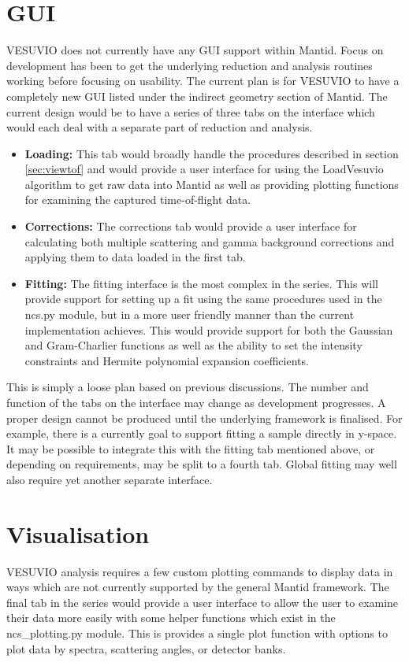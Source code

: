 \documentclass[paper=a4, fontsize=11pt]{scrartcl}	%
\numberwithin{equation}{section}															%
\numberwithin{figure}{section}																%
\numberwithin{table}{section}
\begin{document}
\section{GUI}
\label{sec:GUI}
VESUVIO does not currently have any GUI support within Mantid. Focus on development has been to get the underlying reduction and analysis routines working before focusing on usability. The current plan is for VESUVIO to have a completely new GUI listed under the indirect geometry section of Mantid. The current design would be to have a series of three tabs on the interface which would each deal with a separate part of reduction and analysis.

\begin{itemize}
\item \textbf{Loading:} This tab would broadly handle the procedures described in section \ref{sec:viewtof} and would provide a user interface for using the LoadVesuvio algorithm to get raw data into Mantid as well as providing plotting functions for examining the captured time-of-flight data.

\item \textbf{Corrections:} The corrections tab would provide a user interface for calculating both multiple scattering and gamma background corrections and applying them to data loaded in the first tab.

\item \textbf{Fitting:} The fitting interface is the most complex in the series. This will provide support for setting up a fit using the same procedures used in the ncs.py module, but in a more user friendly manner than the current implementation achieves. This would provide support for both the Gaussian and Gram-Charlier functions as well as the ability to set the intensity constraints and Hermite polynomial expansion coefficients.
\end{itemize}

This is simply a loose plan based on previous discussions. The number and function of the tabs on the interface may change as development progresses. A proper design cannot be produced until the underlying framework is finalised. For example, there is a currently goal to support fitting a sample directly in y-space. It may be possible to integrate this with the fitting tab mentioned above, or depending on requirements, may be split to a fourth tab. Global fitting may well also require yet another separate interface.

\section{Visualisation}
\label{sec:visualisation}
VESUVIO analysis requires a few custom plotting commands to display data in ways which are not currently supported by the general Mantid framework. The final tab in the series would provide a user interface to allow the user to examine their data more easily with some helper functions which exist in the ncs\_plotting.py module. This is provides a single plot function with options to plot data by spectra, scattering angles, or detector banks.
\end{document}
